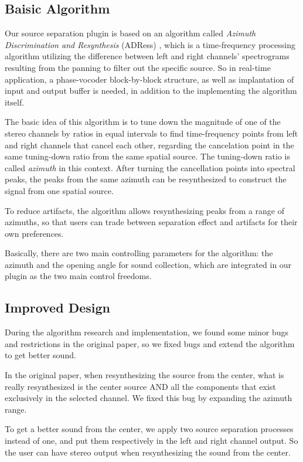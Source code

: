 \documentclass{sig-alternate}
\begin{document}
\subsection{Baisic Algorithm}

Our source separation plugin is based on an algorithm called \textsl{Azimuth Discrimination and Resynthesis} (ADRess) \cite{Barry:04, Barry2:04}, which is a time-frequency processing algorithm utilizing the difference between left and right channels' spectrograms resulting from the panning to filter out the specific source. So in real-time application, a phase-vocoder block-by-block structure, as well as implantation of input and output buffer is needed, in addition to the implementing the algorithm itself.
   
The basic idea of this algorithm is to tune down the magnitude of one of the stereo channels by ratios in equal intervals to find time-frequency points from left and right channels that cancel each other, regarding the cancelation point in the same tuning-down ratio from the same spatial source. The tuning-down ratio is called \textsl{azimuth} in this context. After turning the cancellation points into spectral peaks, the peaks from the same azimuth can be resynthesized to construct the signal from one spatial source. 

To reduce artifacts, the algorithm allows resynthesizing peaks from a range of azimuths, so that users can trade between separation effect and artifacts for their own preferences. 

Basically, there are two main controlling parameters for the algorithm: the azimuth and the opening angle for sound collection, which are integrated in our plugin as the two main control freedoms.


\subsection{Improved Design}

During the algorithm research and implementation, we found some minor bugs and restrictions in the original paper, so we fixed bugs and extend the algorithm to get better sound.
    
In the original paper, when resynthesizing the source from the center, what is really resynthesized is the center source AND all the components that exist exclusively in the selected channel. We fixed this bug by expanding the azimuth range.

To get a better sound from the center, we apply two source separation processes instead of one, and put them respectively in the left and right channel output. So the user can have stereo output when resynthesizing the sound from the center.
\end{document}
